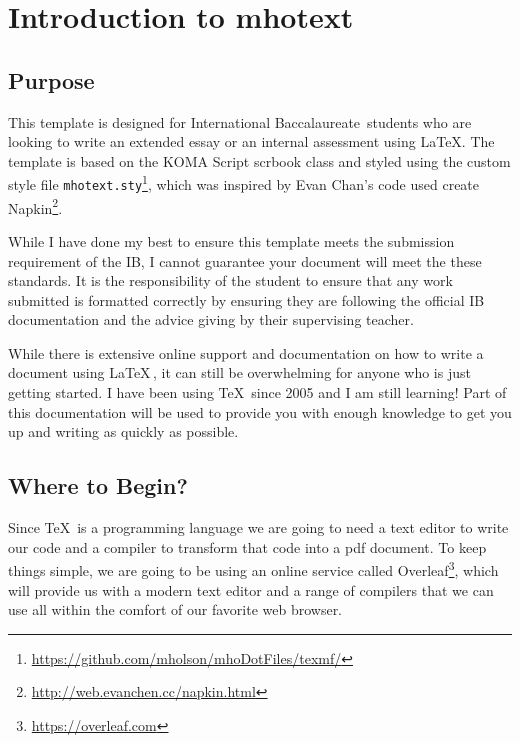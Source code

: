 \chapter{Introduction to mhotext}

\section{Purpose}

This template is designed for International Baccalaureate\texttrademark\, 
students who are looking to write an extended essay or an internal assessment 
using \LaTeX.  The template is based on the KOMA Script scrbook class and styled
using the custom style file 
\texttt{mhotext.sty}\footnote{\url{https://github.com/mholson/mhoDotFiles/texmf/}}, 
which was inspired by Evan Chan's code
used create Napkin\footnote{\url{http://web.evanchen.cc/napkin.html}}.

While I have done my best to ensure this template meets the submission
requirement of the IB, I cannot guarantee your document will meet the 
these standards.  It is the responsibility of the student to ensure that any 
work submitted is formatted correctly by ensuring they are following the 
official IB documentation and the advice giving by their supervising teacher.

While there is extensive online support and documentation on how to write
a document using \LaTeX\,, it can still be overwhelming for anyone who is just
getting started.  I have been using \TeX\, since 2005 and I am still
learning!  Part of this documentation will be used to provide you with
enough knowledge to get you up and writing as quickly as possible.


\section{Where to Begin?}

Since \TeX\, is a programming language we are going to need a text editor
to write our code and a compiler to transform that code into a pdf document.
To keep things simple, we are going to be using an online service called 
Overleaf\footnote{\url{https://overleaf.com}}, which will provide us with a 
modern text editor and a range of compilers that we can use all within the 
comfort of our favorite web browser.

